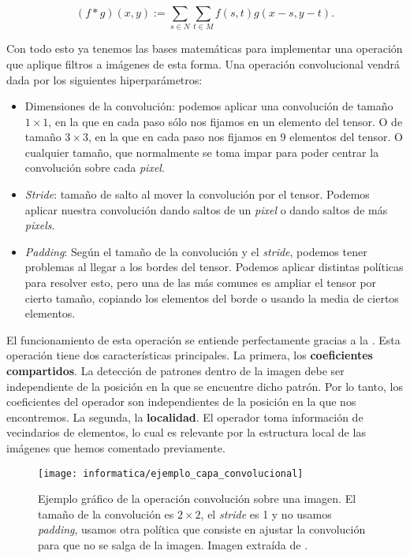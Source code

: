 \begin{equation}
    (f * g)(x, y) := \sum_{s \in N} \sum_{t \in M} f(s, t) g(x - s, y - t).
\end{equation}

Con todo esto ya tenemos las bases matemáticas para implementar una operación que aplique filtros a imágenes de esta forma. Una operación convolucional vendrá dada por los siguientes hiperparámetros:

\begin{itemize}
    \item Dimensiones de la convolución: podemos aplicar una convolución de tamaño $1 \times 1$, en la que en cada paso sólo nos fijamos en un elemento del tensor. O de tamaño $3 \times 3$, en la que en cada paso nos fijamos en 9 elementos del tensor. O cualquier tamaño, que normalmente se toma impar para poder centrar la convolución sobre cada \textit{pixel}.
    \item \textit{Stride}: tamaño de salto al mover la convolución por el tensor. Podemos aplicar nuestra convolución dando saltos de un \textit{pixel} o dando saltos de más \textit{pixels}.
    \item \textit{Padding}: Según el tamaño de la convolución y el \textit{stride}, podemos tener problemas al llegar a los bordes del tensor. Podemos aplicar distintas políticas para resolver esto, pero una de las más comunes es ampliar el tensor por cierto tamaño, copiando los elementos del borde o usando la media de ciertos elementos.
\end{itemize}

El funcionamiento de esta operación se entiende perfectamente gracias a la . Esta operación tiene dos características principales.
La primera, los \textbf{coeficientes compartidos}. La detección de patrones dentro de la imagen debe ser independiente de la posición en la que se encuentre dicho patrón. Por lo tanto, los coeficientes del operador son independientes de la posición en la que nos encontremos. La segunda, la \textbf{localidad}. El operador toma información de vecindarios de elementos, lo cual es relevante por la estructura local de las imágenes que hemos comentado previamente.

\begin{figure}[!hbtp]
    \centering
    \texttt{[image: informatica/ejemplo\_capa\_convolucional]}
    \caption{Ejemplo gráfico de la operación convolución sobre una imagen. El tamaño de la convolución es $2 \times 2$, el \textit{stride} es 1 y no usamos \textit{padding}, usamos otra política que consiste en ajustar la convolución para que no se salga de la imagen. Imagen extraída de \cite{informatica:paper_definicion_cnn}.}
    \label{img:ejemplo_convolucion}
\end{figure}

